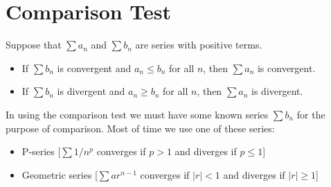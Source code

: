 \section{Comparison Test}

\begin{theorem}
  Suppose that \(\sum a_{n}\) and \(\sum b_{n}\) are series with positive terms.
  \begin{itemize}
    \item If \(\sum b_{n}\) is convergent and \(a_{n} \leq b_{n}\) for all \(n\), then \(\sum a_{n}\) is convergent.
    \item If \(\sum b_{n}\) is divergent and \(a_{n} \geq b_{n}\) for all \(n\), then \(\sum a_{n}\) is divergent.
  \end{itemize}
\end{theorem}

In using the comparison test we must have some known series $\sum b_{n}$ for the purpose of comparison. Most of time we use one of these series:
\begin{itemize}
  \item P-series [\(\sum 1/n^{p}\) converges if $p > 1$ and diverges if $p \le 1$]
  \item Geometric series [\(\sum ar^{n-1}\) converges if $|r| < 1$ and diverges if $|r| \ge 1$]
\end{itemize}


